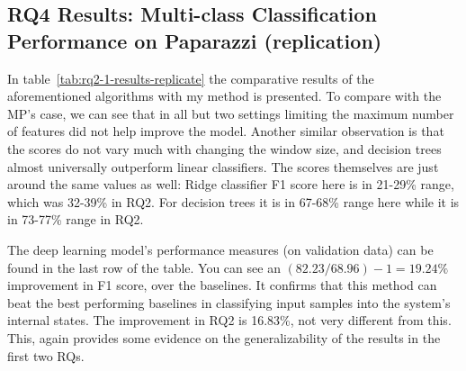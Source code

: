 \subsection{RQ4 Results: Multi-class Classification Performance on Paparazzi (replication)}
In table~\ref{tab:rq2-1-results-replicate} the comparative results of the aforementioned algorithms with my method is presented. 
To compare with the MP's case, we can see that in all but two settings limiting the maximum number of features did not help improve the model. 
Another similar observation is that the scores do not vary much with changing the window size, and decision trees almost universally outperform linear classifiers.
The scores themselves are just around the same values as well: Ridge classifier F1 score here is in 21-29\% range, which was 32-39\% in RQ2. For decision trees it is in 67-68\% range here while it is in 73-77\% range in RQ2. 

The deep learning model's performance measures (on validation data) can be found in the last row of the table. 
You can see an $(82.23/68.96)-1=19.24\%$ improvement in F1 score, over the baselines. It confirms that this method can beat the best performing baselines in classifying input samples into the system's internal states. The improvement in RQ2 is 16.83\%, not very different from this. This, again provides some evidence on the generalizability of the results in the first two RQs.

